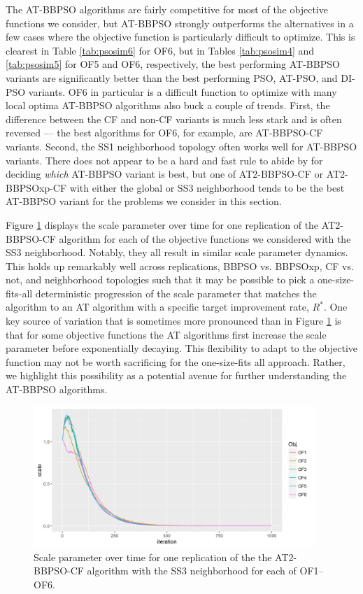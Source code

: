 \documentclass[cmbright]{staauth}
\begin{document}
The AT-BBPSO algorithms are fairly competitive for most of the objective functions we consider, but AT-BBPSO strongly outperforms the alternatives in a few cases where the objective function is particularly difficult to optimize. This is clearest in Table \ref{tab:psosim6} for OF6, but in Tables \ref{tab:psosim4} and \ref{tab:psosim5} for OF5 and OF6, respectively, the best performing AT-BBPSO variants are significantly better than the best performing PSO, AT-PSO, and DI-PSO variants. OF6 in particular is a difficult function to optimize with many local optima AT-BBPSO algorithms also buck a couple of trends. First, the difference between the CF and non-CF variants is much less stark and is often reversed --- the best algorithms for OF6, for example, are AT-BBPSO-CF variants. Second, the SS1 neighborhood topology often works well for AT-BBPSO variants. There does not appear to be a hard and fast rule to abide by for deciding \emph{which} AT-BBPSO variant is best, but one of AT2-BBPSO-CF or AT2-BBPSOxp-CF with either the global or SS3 neighborhood tends to be the best AT-BBPSO variant for the problems we consider in this section.

Figure \ref{fig:scale} displays the scale parameter over time for one replication of the AT2-BBPSO-CF algorithm for each of the objective functions we considered with the SS3 neighborhood. Notably, they all result in similar scale parameter dynamics. This holds up remarkably well across replications, BBPSO vs. BBPSOxp, CF vs. not, and neighborhood topologies such that it may be possible to pick a one-size-fits-all deterministic progression of the scale parameter that matches the algorithm to an AT algorithm with a specific target improvement rate, $R^*$. One key source of variation that is sometimes more pronounced than in Figure \ref{fig:scale} is that for some objective functions the AT algorithms first increase the scale parameter before exponentially decaying. This flexibility to adapt to the objective function may not be worth sacrificing for the one-size-fits all approach. Rather, we highlight this possibility as a potential avenue for further understanding the AT-BBPSO algorithms.

\begin{figure}[p]
\centering
\includegraphics[width=0.95\textwidth]{../code/psosims/scaleplot.png}
\caption{Scale parameter over time for one replication of the the AT2-BBPSO-CF algorithm with the SS3 neighborhood for each of OF1--OF6.}
\label{fig:scale}
\end{figure}
\end{document}

